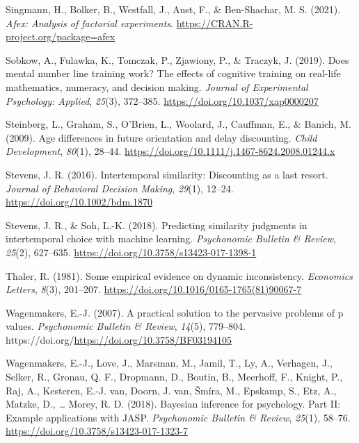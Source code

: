 \documentclass[
  pub,floatsintext]{apa6}
\newlength{\cslhangindent}
\newlength{\cslentryspacingunit} %
\newenvironment{CSLReferences}[2] %
 {%
  \setlength{\parindent}{0pt}
  \ifodd #1
  \let\oldpar\par
  \def\par{\hangindent=\cslhangindent\oldpar}
  \fi
  \setlength{\parskip}{#2\cslentryspacingunit}
 }%
 {}
\begin{document}
\begin{CSLReferences}{1}{0}
\leavevmode{}%
Singmann, H., Bolker, B., Westfall, J., Aust, F., \& Ben-Shachar, M. S. (2021). \emph{Afex: Analysis of factorial experiments}. \url{https://CRAN.R-project.org/package=afex}

\leavevmode{}%
Sobkow, A., Fulawka, K., Tomczak, P., Zjawiony, P., \& Traczyk, J. (2019). Does mental number line training work? {The} effects of cognitive training on real-life mathematics, numeracy, and decision making. \emph{Journal of Experimental Psychology: Applied}, \emph{25}(3), 372--385. \url{https://doi.org/10.1037/xap0000207}

\leavevmode{}%
Steinberg, L., Graham, S., O'Brien, L., Woolard, J., Cauffman, E., \& Banich, M. (2009). Age differences in future orientation and delay discounting. \emph{Child Development}, \emph{80}(1), 28--44. \url{https://doi.org/10.1111/j.1467-8624.2008.01244.x}

\leavevmode{}%
Stevens, J. R. (2016). Intertemporal similarity: {Discounting} as a last resort. \emph{Journal of Behavioral Decision Making}, \emph{29}(1), 12--24. \url{https://doi.org/10.1002/bdm.1870}

\leavevmode{}%
Stevens, J. R., \& Soh, L.-K. (2018). Predicting similarity judgments in intertemporal choice with machine learning. \emph{Psychonomic Bulletin \& Review}, \emph{25}(2), 627--635. \url{https://doi.org/10.3758/s13423-017-1398-1}

\leavevmode{}%
Thaler, R. (1981). Some empirical evidence on dynamic inconsistency. \emph{Economics Letters}, \emph{8}(3), 201--207. \url{https://doi.org/10.1016/0165-1765(81)90067-7}

\leavevmode{}%
Wagenmakers, E.-J. (2007). A practical solution to the pervasive problems of p values. \emph{Psychonomic Bulletin \& Review}, \emph{14}(5), 779--804. https://doi.org/\url{https://doi.org/10.3758/BF03194105}

\leavevmode{}%
Wagenmakers, E.-J., Love, J., Marsman, M., Jamil, T., Ly, A., Verhagen, J., Selker, R., Gronau, Q. F., Dropmann, D., Boutin, B., Meerhoff, F., Knight, P., Raj, A., Kesteren, E.-J. van, Doorn, J. van, Šmíra, M., Epskamp, S., Etz, A., Matzke, D., \ldots{} Morey, R. D. (2018). Bayesian inference for psychology. {Part} {II}: {Example} applications with {JASP}. \emph{Psychonomic Bulletin \& Review}, \emph{25}(1), 58--76. \url{https://doi.org/10.3758/s13423-017-1323-7}


\end{CSLReferences}
\end{document}
